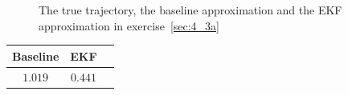 \documentclass[a4paper,oneside,article]{memoir}
\newcommand{\otoprule}{\midrule[\heavyrulewidth]}
\begin{document}
\begin{figure}[htb]
  \begin{adjustwidth}{-2in}{-2in}
	  \centering
  \end{adjustwidth}
  	  \caption{The true trajectory, the baseline approximation and the EKF approximation in exercise~\ref{sec:4_3a}}
	  \label{fig:ex_4_3}
\end{figure}



\begin{table}[h]
	\centering
	\begin{tabular}{c c c}
		\otoprule
		Baseline & EKF\\
		\midrule
		$1.019$ & $0.441$\\
		\bottomrule
	\end{tabular}
	\label{table:rmse4_3}
\end{table}
\end{document}

